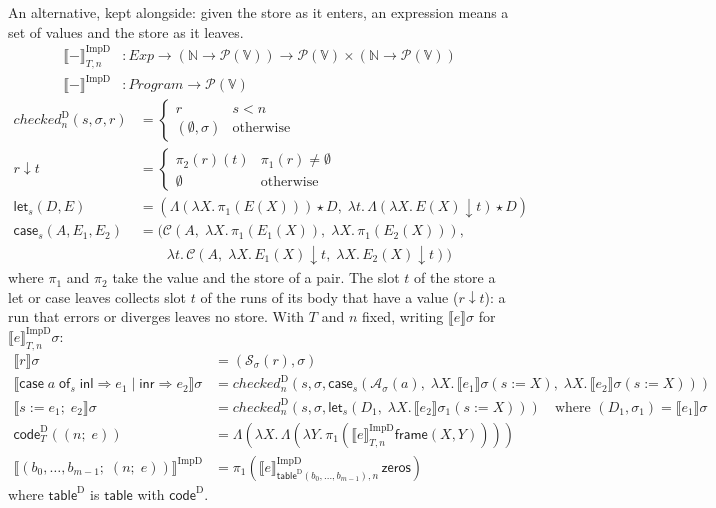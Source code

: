 \documentclass[10pt]{article}
\theoremstyle{acmplain}
\newcommand{\SEM}[1]{\llbracket #1 \rrbracket}
\newcommand{\key}[1]{\mathsf{#1}}
\newcommand{\SET}[1]{\mathcal{P}(#1)}
\newcommand{\V}{\mathbb{V}}
\newcommand{\ext}[3]{#1(#2{:=}#3)}
\newcommand{\app}{\star}
\newcommand{\NE}{\neq\emptyset}
\newcommand{\assign}[3]{#1 \mathrel{:=} #2;\; #3}
\newcommand{\Casei}[4]{\key{case}\;#1\;\key{of}_{#2}\;\key{inl} \Rightarrow #3 \mid \key{inr} \Rightarrow #4}
\begin{document}
An alternative, kept alongside: given the store as it enters, an
expression means a set of values and the store as it leaves.
\begin{align*}
  \SEM{-}^{\mathrm{ImpD}}_{T,n} &: \mathit{Exp} \to (\mathbb{N} \to \SET{\V}) \to \SET{\V} \times (\mathbb{N} \to \SET{\V}) \\
  \SEM{-}^{\mathrm{ImpD}} &: \mathit{Program} \to \SET{\V}
\end{align*}
\begin{align*}
  \mathit{checked}^{\mathrm{D}}_n(s, \sigma, r) &=
    \begin{cases} r & s < n \\ (\emptyset, \sigma) & \text{otherwise} \end{cases} \\[1ex]
  r{\downarrow}t &=
    \begin{cases} \pi_2(r)(t) & \pi_1(r) \NE \\ \emptyset & \text{otherwise} \end{cases} \\
  \key{let}_s(D, E) &= (\Lambda(\lambda X.\, \pi_1(E(X))) \app D,\;
    \lambda t.\, \Lambda(\lambda X.\, E(X){\downarrow}t) \app D) \\
  \key{case}_s(A, E_1, E_2) &= (\mathcal{C}(A,\; \lambda X.\, \pi_1(E_1(X)),\; \lambda X.\, \pi_1(E_2(X))), \\
    &\qquad \lambda t.\, \mathcal{C}(A,\; \lambda X.\, E_1(X){\downarrow}t,\; \lambda X.\, E_2(X){\downarrow}t))
\end{align*}
where $\pi_1$ and $\pi_2$ take the value and the store of a pair. The
slot $t$ of the store a let or case leaves collects slot $t$ of the runs
of its body that have a value ($r{\downarrow}t$): a run that errors
or diverges leaves no store.
With $T$ and $n$ fixed, writing $\SEM{e}\sigma$ for $\SEM{e}^{\mathrm{ImpD}}_{T,n}\sigma$:
\begin{align*}
  \SEM{r}\sigma &= (\mathcal{S}_\sigma(r), \sigma) \\
  \SEM{\Casei{a}{s}{e_1}{e_2}}\sigma &= \mathit{checked}^{\mathrm{D}}_n(s, \sigma,
    \key{case}_s(\mathcal{A}_\sigma(a),\; \lambda X.\, \SEM{e_1}\ext{\sigma}{s}{X},\; \lambda X.\, \SEM{e_2}\ext{\sigma}{s}{X})) \\
  \SEM{\assign{s}{e_1}{e_2}}\sigma &= \mathit{checked}^{\mathrm{D}}_n(s, \sigma,
    \key{let}_s(D_1,\; \lambda X.\, \SEM{e_2}\ext{\sigma_1}{s}{X}))
    \quad\text{where } (D_1, \sigma_1) = \SEM{e_1}\sigma \\[1ex]
  \key{code}^{\mathrm{D}}_T((n;\; e)) &= \Lambda(\lambda X.\, \Lambda(\lambda Y.\, \pi_1(\SEM{e}^{\mathrm{ImpD}}_{T,n}\key{frame}(X, Y)))) \\
  \SEM{(b_0, \ldots, b_{m-1};\; (n;\; e))}^{\mathrm{ImpD}} &=
    \pi_1(\SEM{e}^{\mathrm{ImpD}}_{\key{table}^{\mathrm{D}}(b_0,\ldots,b_{m-1}),n}\,\key{zeros})
\end{align*}
where $\key{table}^{\mathrm{D}}$ is $\key{table}$ with $\key{code}^{\mathrm{D}}$.
\end{document}
